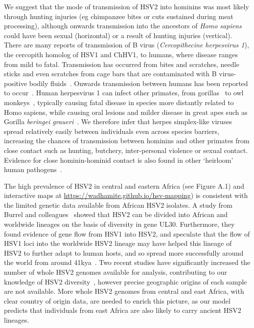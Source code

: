 \documentclass[fleqn,10pt]{wlscirep}
\begin{document}
We suggest that the mode of transmission of HSV2 into hominins was most likely through hunting injuries (eg chimpanzee bites or cuts sustained during meat processing), although onwards transmission into the ancestors of \textit{Homo sapiens} could have been sexual (horizontal) or a result of hunting injuries (vertical). There are many reports of transmission of B virus (\textit{Cercopithecine herpesvirus 1}), the cercopith homolog of HSV1 and ChHV1, to humans, where disease ranges from mild to fatal. Transmission has occurred from bites and scratches, needle sticks and even scratches from cage bars that are contaminated with B virus-positive bodily fluids~\cite{Huff2003}. Onwards transmission between humans has been reported to occur~\cite{CentersforDiseaseControlCDC1987}. Human herpesvirus 1 can infect other primates, from gorillas~\cite{Gilardi2014} to owl monkeys~\cite{Melendez1969}, typically causing fatal disease in species more distantly related to Homo sapiens, while causing oral lesions and milder disease in great apes such as Gorilla \textit{beringei graueri}~\cite{Gilardi2014}. We therefore infer that herpes simplex-like viruses spread relatively easily between individuals even across species barriers, increasing the chances of transmission between hominins and other primates from close contact such as hunting, butchery, inter-personal violence or sexual contact. Evidence for close hominin-hominid contact is also found in other `heirloom' human pathogens~\cite{Houldcroft2017a}.

The high prevalence of HSV2 in central and eastern Africa (see Figure A.1) and interactive maps at \url{https://wadhamite.github.io/hsv-mapping}) is consistent with the limited genetic data available from African HSV2 isolates. A study from Burrel and colleagues~\cite{Burrel2015} showed that HSV2 can be divided into African and worldwide lineages on the basis of diversity in gene UL30. Furthermore, they found evidence of gene flow from HSV1 into HSV2, and speculate that the flow of HSV1 loci into the worldwide HSV2 lineage may have helped this lineage of HSV2 to further adapt to human hosts, and so spread more successfully around the world from around 41kya~\cite{Burrel}. Two recent studies have significantly increased the number of whole HSV2 genomes available for analysis, contributing to our knowledge of HSV2 diversity~\cite{Szpara2014,Kolb2015}, however precise geographic origins of each sample are not available. More whole HSV2 genomes from central and east Africa, with clear country of origin data, are needed to enrich this picture, as our model predicts that individuals from east Africa are also likely to carry ancient HSV2 lineages. 
\end{document}
